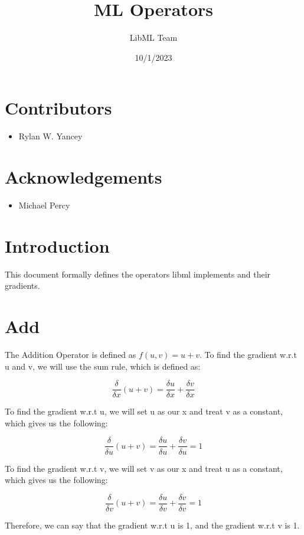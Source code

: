 \documentclass{article}
\title{ML Operators}
\author{LibML Team}
\date{10/1/2023}
\begin{document}
    \maketitle
    \section*{Contributors}
        \begin{itemize}
            \item Rylan W. Yancey
        \end{itemize}
    \section*{Acknowledgements}
        \begin{itemize}
            \item Michael Percy
        \end{itemize}
    \section*{Introduction}
        This document formally defines the operators libml implements and their gradients.  

\noindent\makebox[\linewidth]{\rule{\paperwidth}{0.4pt}}
    \section{Add}
        The Addition Operator is defined as $f(u,v) = u + v$. To find the gradient w.r.t u and v, 
        we will use the sum rule, which is defined as: 

        $$\frac{\delta}{\delta{x}}(u + v) = \frac{\delta{u}}{\delta{x}} + \frac{\delta{v}}{\delta{x}}$$

        To find the gradient w.r.t u, we will set u as our x and treat v as a constant, 
        which gives us the following:

        $$\frac{\delta}{\delta{u}}(u + v) = \frac{\delta{u}}{\delta{u}} + \frac{\delta{v}}{\delta{u}} = 1$$

        To find the gradient w.r.t v, we will set v as our x and treat u as a constant, 
        which gives us the following:

        $$\frac{\delta}{\delta{v}}(u + v) = \frac{\delta{u}}{\delta{v}} + \frac{\delta{v}}{\delta{v}} = 1$$

        Therefore, we can say that the gradient w.r.t u is 1, and the gradient w.r.t v is 1.
\end{document}
